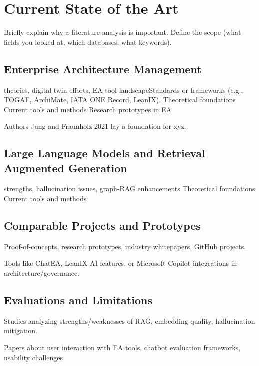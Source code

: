 \chapter{Current State of the Art}
\label{ch:SOTA}
Briefly explain why a literature analysis is important. Define the scope (what fields you looked at, which databases, what keywords).



%
%
\section{Enterprise Architecture Management}
\label{sec:intro:eam}
theories, digital twin efforts, EA tool landscapeStandards or frameworks (e.g., TOGAF, ArchiMate, IATA ONE Record, LeanIX).
Theoretical foundations
Current tools and methods
Research prototypes in EA

Authors Jung and Fraunholz 2021 \cite{jung2021masterclass} lay a foundation for xyz.


%
%
\section{Large Language Models and Retrieval Augmented Generation}
\label{sec:intro:llmandrag}
strengths, hallucination issues, graph-RAG enhancements
Theoretical foundations
Current tools and methods



%
%
\section{Comparable Projects and Prototypes}
\label{sec:intro:prototypes}
Proof-of-concepts, research prototypes, industry whitepapers, GitHub projects.

Tools like ChatEA, LeanIX AI features, or Microsoft Copilot integrations in architecture/governance.


%
%
\section{Evaluations and Limitations}
\label{sec:intro:limitations}
Studies analyzing strengths/weaknesses of RAG, embedding quality, hallucination mitigation.

Papers about user interaction with EA tools, chatbot evaluation frameworks, usability challenges
